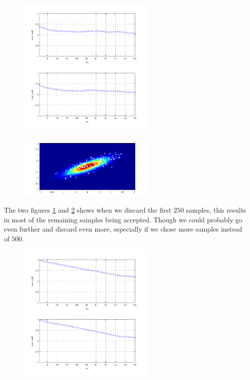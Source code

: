 \documentclass[a4paper, 10pt, final]{article}
\begin{document}
\begin{figure}[!htpb]
  \centering
  \includegraphics[width=0.6\textwidth]{images/q1_7g}
  \caption{}
  \label{fig:q1_7g}
\end{figure}

\begin{figure}[!htpb]
  \centering
  \includegraphics[width=0.6\textwidth]{images/q1_7h}
  \caption{}
  \label{fig:q1_7h}
\end{figure}

The two figures \ref{fig:q1_7g} and \ref{fig:q1_7h} shows when we discard the first $250$ samples, this results in most of the remaining samples being accepted. Though we could probably go even further and discard even more, especially if we chose more samples instead of $500$.


\begin{figure}[!htpb]
  \centering
  \includegraphics[width=0.6\textwidth]{images/q1_7i}
  \caption{}
  \label{fig:q1_7i}
\end{figure}
\end{document}
